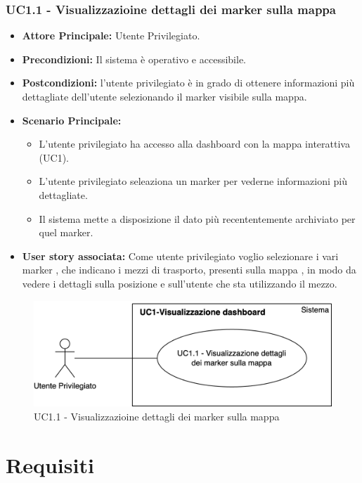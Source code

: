 \documentclass[11pt]{article}
\begin{document}
\begin{justify}
\subsubsection{\textbf{UC1.1 - Visualizzazioine dettagli dei marker sulla mappa }}
\begin{itemize}
     \item \textbf{Attore Principale:} Utente Privilegiato.
     \item \textbf{Precondizioni:} Il sistema è operativo e accessibile.
     \item \textbf{Postcondizioni:} l'utente privilegiato è in grado di ottenere informazioni più dettagliate dell'utente selezionando il marker visibile sulla mappa.
     \item \textbf{Scenario Principale:}
     \begin{itemize}
         \item L'utente privilegiato ha accesso alla dashboard con la mappa interattiva (UC1).
         \item L'utente privilegiato seleaziona un marker per vederne informazioni più dettagliate.
         \item Il sistema mette a disposizione il dato più recententemente archiviato per quel marker.
     \end{itemize}
     \item \textbf{User story associata:}
     Come utente privilegiato voglio selezionare i vari marker , che indicano i mezzi di trasporto, presenti sulla mappa , in modo da vedere i dettagli sulla posizione e sull'utente che sta utilizzando il mezzo.
\end{itemize}
\begin{figure}[ht]
    \centering
    \includegraphics[width=0.5\linewidth]{UC1.1image.png}
    \caption{UC1.1 - Visualizzazioine dettagli dei marker sulla mappa}
    \label{fig:UC1.1}
\end{figure}



\newpage
\section{Requisiti}


\end{justify}
\end{document}
